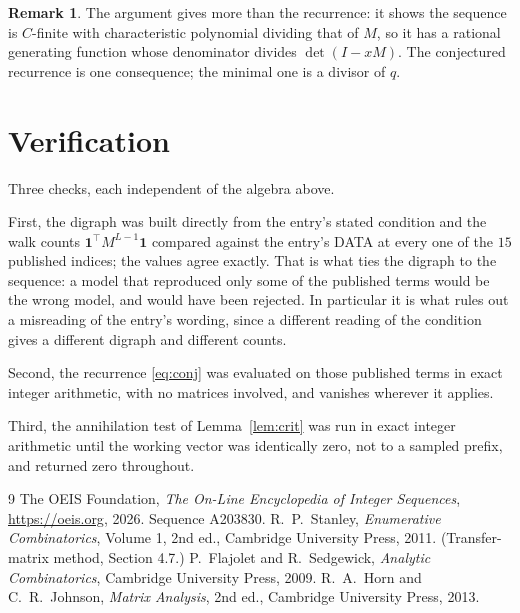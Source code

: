 \documentclass[11pt,a4paper]{article}
\theoremstyle{plain}
\theoremstyle{definition}
\newtheorem{remark}[theorem]{Remark}
\begin{document}
\begin{remark}
The argument gives more than the recurrence: it shows the sequence is $C$-finite with
characteristic polynomial dividing that of $M$, so it has a rational generating function
whose denominator divides $\det(I-xM)$. The conjectured recurrence is one consequence; the
minimal one is a divisor of $q$.
\end{remark}

\section{Verification}

Three checks, each independent of the algebra above.

First, the digraph was built directly from the entry's stated condition and the walk counts
$\mathbf{1}^{\!\top}M^{L-1}\mathbf{1}$ compared against the entry's DATA at
every one of the $15$ published indices; the values agree exactly. That is what ties
the digraph to the sequence: a model that reproduced only some of the published terms would
be the wrong model, and would have been rejected. In particular it is what rules out a
misreading of the entry's wording, since a different reading of the condition gives a
different digraph and different counts.

Second, the recurrence \eqref{eq:conj} was evaluated on those published terms in exact
integer arithmetic, with no matrices involved, and vanishes wherever it applies.

Third, the annihilation test of Lemma~\ref{lem:crit} was run in exact integer arithmetic
until the working vector was identically zero, not to a sampled prefix, and returned zero
throughout.

\begin{thebibliography}{9}
 The OEIS Foundation, \emph{The On-Line Encyclopedia of Integer
Sequences}, \url{https://oeis.org}, 2026. Sequence A203830.
 R.~P.~Stanley, \emph{Enumerative Combinatorics}, Volume 1, 2nd ed.,
Cambridge University Press, 2011. (Transfer-matrix method, Section 4.7.)
 P.~Flajolet and R.~Sedgewick, \emph{Analytic Combinatorics}, Cambridge
University Press, 2009.
 R.~A.~Horn and C.~R.~Johnson, \emph{Matrix Analysis}, 2nd ed., Cambridge
University Press, 2013.
\end{thebibliography}
\end{document}
